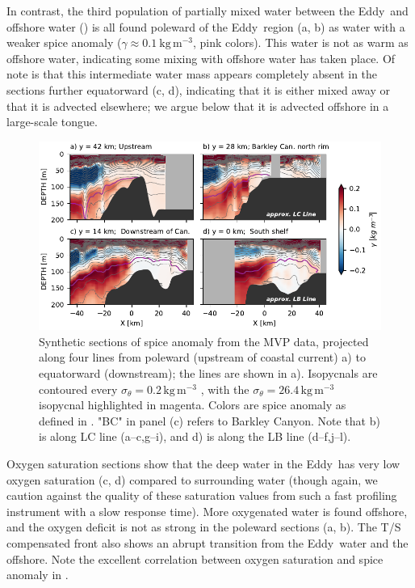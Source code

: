 \documentclass[draft]{agujournal2019}
\newcommand*{\Eddy}{{\sc Eddy}}
\begin{document}
In contrast, the third population of partially mixed water between the \Eddy\ and offshore water () is all found poleward of the \Eddy\ region (a, b) as water with a weaker spice anomaly ($\gamma \approx 0.1\ \mathrm{kg\,m^{-3}}$, pink colors).  This water is not as warm as offshore water, indicating some mixing with offshore water has taken place.  Of note is that this intermediate water mass appears completely absent in the sections further equatorward (c, d), indicating that it is either mixed away or that it is advected elsewhere; we argue below that it is advected offshore in a large-scale tongue.

\begin{figure}[htbp]
  \begin{center}
    \includegraphics[width=6.2in]{CrossSectionsSpice}
    \caption{Synthetic sections of spice anomaly from the MVP data, projected along four lines from poleward (upstream of coastal current) a) to equatorward (downstream); the lines are shown in a).    Isopycnals are contoured every $\sigma_{\theta} = 0.2\,\mathrm{kg\,m^{-3}}$ , with the $\sigma_{\theta} = 26.4\,\mathrm{kg\,m^{-3}}$ isopycnal highlighted in magenta.  Colors are spice anomaly as defined in . "BC" in panel (c) refers to Barkley Canyon. Note that b) is along LC line (a--c,g--i), and d) is along the LB line (d--f,j--l).
      \label{fig:CrossSectionsSpice} }
  \end{center}
\end{figure}

Oxygen saturation sections show that the deep water in the  \Eddy\ has very low oxygen saturation (c, d) compared to surrounding water (though again, we caution against the quality of these saturation values from such a fast profiling instrument with a slow response time).  More oxygenated water is found offshore, and the oxygen deficit is not as strong in the poleward sections (a, b).  The T/S compensated front also shows an abrupt transition from the \Eddy\ water and the offshore. Note the excellent correlation between oxygen saturation and spice anomaly in .
\end{document}

